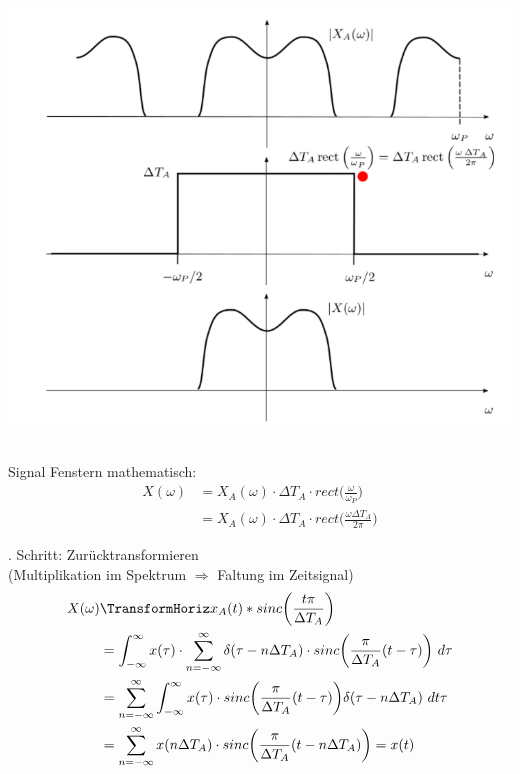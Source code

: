 \documentclass[12pt,a4paper]{scrartcl}
\begin{document}
  \includegraphics[height = 12cm]{Pictures/Fenstern.png}

  \noindent Signal Fenstern mathematisch: \\
  \begin{equation}
    \label{eq:116}
    \begin{split}
      X(\omega) &= X_A(\omega) \cdot \Delta T_A \cdot rect\bigg(\frac{\omega}{\omega_P}\bigg) \\
      &= X_A(\omega) \cdot \Delta T_A \cdot rect\bigg(\frac{\omega \Delta T_A}{2\pi}\bigg)
    \end{split}
  \end{equation} 

  . Schritt: Zurücktransformieren\\
  (Multiplikation im Spektrum $\Rightarrow$ Faltung im Zeitsignal)
  \begin{equation}
    \label{eq:17}
    \begin{split}
      X(\omega) &\TransformHoriz x_A(t) * sinc\bigg(\frac{t\pi}{\Delta T_A}\bigg) \\
        &= \int_{-\infty}^{\infty}x(\tau) \cdot \sum_{n=-\infty}^{\infty} \delta(\tau - n\Delta T_A) \cdot sinc\bigg(\frac{\pi}{\Delta T_A}(t-\tau)\bigg)\ d\tau \\
         &= \sum_{n=-\infty}^{\infty} \int_{-\infty}^{\infty}x(\tau) \cdot sinc\bigg(\frac{\pi}{\Delta T_A}(t-\tau)\bigg) \delta(\tau - n\Delta T_A)\ dt \tau \\
         &= \sum_{n=-\infty}^{\infty} x(n \Delta T_A) \cdot sinc\bigg(\frac{\pi}{\Delta T_A}(t-n\Delta T_A)\bigg) = x(t) 
        \end{split}
  \end{equation} 
\end{document}
